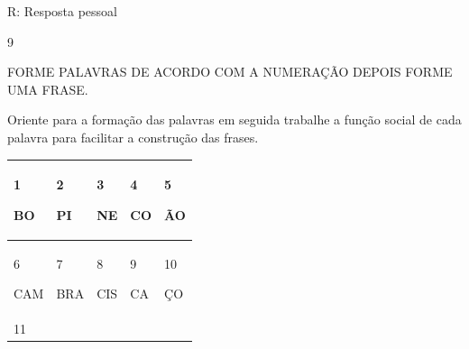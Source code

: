 {{R: Resposta pessoal

\num{9}

FORME PALAVRAS DE ACORDO COM A NUMERAÇÃO DEPOIS FORME UMA FRASE.

Oriente para a formação das palavras em seguida trabalhe a função social
de cada palavra para facilitar a construção das frases.

\begin{longtable}[]{@{}lllll@{}}
\toprule
\begin{minipage}[b]{0.19\columnwidth}\raggedright\strut
1

BO\strut
\end{minipage} & \begin{minipage}[b]{0.19\columnwidth}\raggedright\strut
2

PI\strut
\end{minipage} & \begin{minipage}[b]{0.19\columnwidth}\raggedright\strut
3

NE\strut
\end{minipage} & \begin{minipage}[b]{0.19\columnwidth}\raggedright\strut
4

CO\strut
\end{minipage} & \begin{minipage}[b]{0.19\columnwidth}\raggedright\strut
5

ÃO\strut
\end{minipage}\tabularnewline
\midrule
\endhead
\begin{minipage}[t]{0.19\columnwidth}\raggedright\strut
6

CAM\strut
\end{minipage} & \begin{minipage}[t]{0.19\columnwidth}\raggedright\strut
7

BRA\strut
\end{minipage} & \begin{minipage}[t]{0.19\columnwidth}\raggedright\strut
8

CIS\strut
\end{minipage} & \begin{minipage}[t]{0.19\columnwidth}\raggedright\strut
9

CA\strut
\end{minipage} & \begin{minipage}[t]{0.19\columnwidth}\raggedright\strut
10

ÇO\strut
\end{minipage}\tabularnewline
\begin{minipage}[t]{0.19\columnwidth}\raggedright\strut
11


\end{minipage}
\end{longtable}}}
